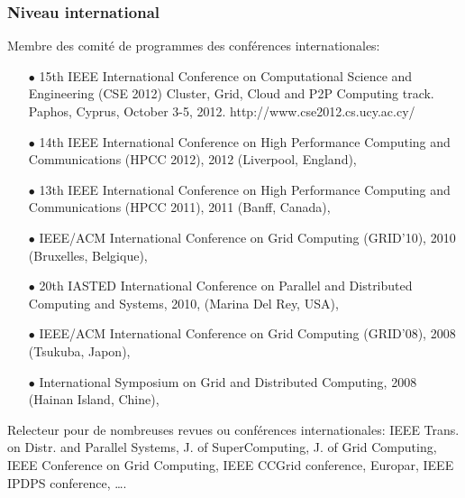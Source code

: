 \subsubsection{Niveau international}
Membre des comité de programmes des conférences internationales:\\[-3mm]
\begin{itemize}
\item[$\bullet$]
15th IEEE International Conference on Computational Science and Engineering (CSE 2012) 
Cluster, Grid, Cloud and P2P Computing track. Paphos, Cyprus, October 3-5, 2012. 
http://www.cse2012.cs.ucy.ac.cy/

\item[$\bullet$] 
14th IEEE International Conference on High Performance Computing and Communications (HPCC 2012), 
2012 (Liverpool, England),
\item[$\bullet$] 
13th IEEE International Conference on High Performance Computing and Communications (HPCC 2011), 
2011 (Banff, Canada),
\item[$\bullet$] 
IEEE/ACM International Conference on Grid Computing (GRID'10), 2010 (Bruxelles, Belgique),
\item[$\bullet$] 
20th IASTED International Conference on Parallel and Distributed Computing and Systems, 2010, (Marina Del Rey, USA),
\item[$\bullet$] 
IEEE/ACM International Conference on Grid Computing (GRID'08), 2008 (Tsukuba, Japon), 
\item [$\bullet$]
International Symposium on Grid and Distributed Computing, 2008 (Hainan Island, Chine),\\
\end{itemize}

Relecteur pour de nombreuses revues ou conférences internationales: IEEE Trans. on Distr. and Parallel Systems, 
J. of SuperComputing, J. of Grid Computing, IEEE Conference on Grid Computing, IEEE CCGrid conference, Europar,
IEEE IPDPS conference, \ldots.


